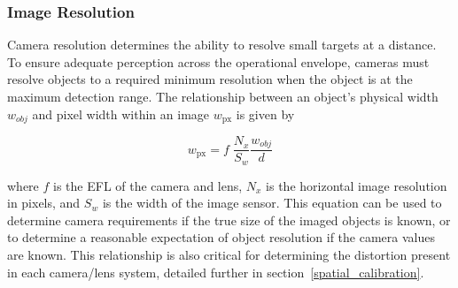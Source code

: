 \documentclass[../main.tex]{subfiles}
\begin{document}
\subsubsection{Image Resolution}
Camera resolution determines the ability to resolve small targets at a distance.
To ensure adequate perception across the operational envelope, cameras must resolve objects to a required minimum resolution when the object is at the maximum detection range.
The relationship between an object's physical width $\mathit{w}_{obj}$ and pixel width within an image $\mathit{w}_{\text{px}}$ is given by

\begin{equation}
\mathit{w}_{\text{px}} = f \; \frac{N_x}{S_w}\frac{\mathit{w}_{obj}}{d}
\end{equation}

where $f$ is the \ac{EFL} of the camera and lens, $N_x$ is the horizontal image resolution in pixels, and $S_w$ is the width of the image sensor.
This equation can be used to determine camera requirements if the true size of the imaged objects is known, or to determine a reasonable expectation of object resolution if the camera values are known.
This relationship is also critical for determining the distortion present in each camera/lens system, detailed further in section~\ref{spatial_calibration}.
\end{document}
